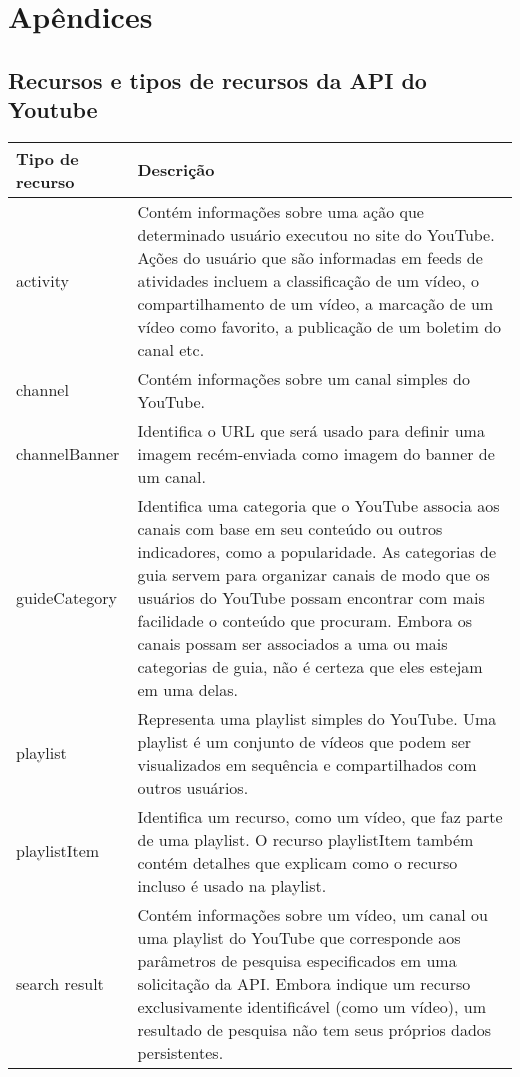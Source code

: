 \chapter{Apêndices}
\label{cha: apendices}

\section{Recursos e tipos de recursos da API do Youtube}
\label{sec: RecursosYoutube}

\begin{table}[ht]
\begin{tabular}{|p{3cm}|p{12cm}|}
\hline
\rowcolor[HTML]{CFCFCF} 
Tipo de recurso	&	Descrição	 \\ \hline
activity	    &	Contém informações sobre uma ação que determinado usuário executou no site do YouTube. Ações do usuário que são informadas em feeds de atividades incluem a classificação de um vídeo, o compartilhamento de um vídeo, a marcação de um vídeo como favorito, a publicação de um boletim do canal etc.	\\ \hline
channel	        &	Contém informações sobre um canal simples do YouTube.	\\ \hline
channelBanner	&	Identifica o URL que será usado para definir uma imagem recém-enviada como imagem do banner de um canal.	\\ \hline
guideCategory	&	Identifica uma categoria que o YouTube associa aos canais com base em seu conteúdo ou outros indicadores, como a popularidade. As categorias de guia servem para organizar canais de modo que os usuários do YouTube possam encontrar com mais facilidade o conteúdo que procuram. Embora os canais possam ser associados a uma ou mais categorias de guia, não é certeza que eles estejam em uma delas.	\\ \hline
playlist	    &	Representa uma playlist simples do YouTube. Uma playlist é um conjunto de vídeos que podem ser visualizados em sequência e compartilhados com outros usuários.	\\ \hline
playlistItem	&	Identifica um recurso, como um vídeo, que faz parte de uma playlist. O recurso playlistItem também contém detalhes que explicam como o recurso incluso é usado na playlist.	\\ \hline
search result	&	Contém informações sobre um vídeo, um canal ou uma playlist do YouTube que corresponde aos parâmetros de pesquisa especificados em uma solicitação da API. Embora indique um recurso exclusivamente identificável (como um vídeo), um resultado de pesquisa não tem seus próprios dados persistentes.	\\ \hline

\end{tabular}
\end{table}
